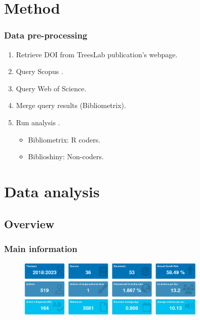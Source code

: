 \documentclass[aspectratio=169]{beamer}
\begin{document}
\section{Method}

\begin{frame}
  \frametitle{Data pre-processing}
  \begin{enumerate}
    \item Retrieve DOI from TreesLab publication's webpage. 
    \item Query Scopus .
    \item Query Web of Science.
    \item Merge query results (Bibliometrix).
    \item Run analysis .
      \begin{itemize}
        \item Bibliometrix: R coders.
        \item Biblioshiny: Non-coders.
      \end{itemize}
  \end{enumerate}
\end{frame}



\section{Data analysis}

\subsection{Overview}

\begin{frame}
  \frametitle{Main information}
  \begin{figure}
    \centering
    \includegraphics[width=0.8\textwidth]{img/main_information.png}
    \label{fig:main_information}
  \end{figure}
\end{frame}
\end{document}
